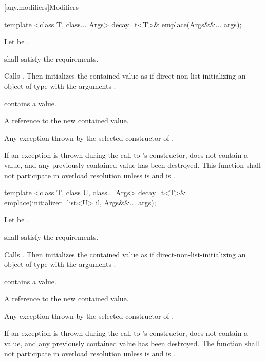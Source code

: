 [any.modifiers]{Modifiers}

%
\begin{itemdecl}
template <class T, class... Args>
  decay_t<T>& emplace(Args&&... args);
\end{itemdecl}

\begin{itemdescr}
\pnum
Let  be .

\pnum
\requires
{} shall satisfy the  requirements.

\pnum
\effects Calls .
Then initializes the contained value as if direct-non-list-initializing
an object of type  with the arguments .

\pnum
\postconditions {} contains a value.

\pnum
\returns
A reference to the new contained value.

\pnum
\throws Any exception thrown by the selected constructor of .

\pnum
\remarks If an exception is thrown during the call to 's constructor,
 does not contain a value, and any previously contained value
has been destroyed.
This function shall not participate in overload resolution unless
 is  and
 is .
\end{itemdescr}

%
\begin{itemdecl}
template <class T, class U, class... Args>
  decay_t<T>& emplace(initializer_list<U> il, Args&&... args);
\end{itemdecl}

\begin{itemdescr}
\pnum
Let  be .

\pnum
\requires
{} shall satisfy the  requirements.

\pnum
\effects Calls . Then initializes the contained value
as if direct-non-list-initializing an object of type  with the arguments
.

\pnum
\postconditions {} contains a value.

\pnum
\returns
A reference to the new contained value.

\pnum
\throws Any exception thrown by the selected constructor of .

\pnum
\remarks If an exception is thrown during the call to 's constructor,
 does not contain a value, and any previously contained value
has been destroyed.
The function shall not participate in overload resolution unless
 is  and
 is .
\end{itemdescr}

